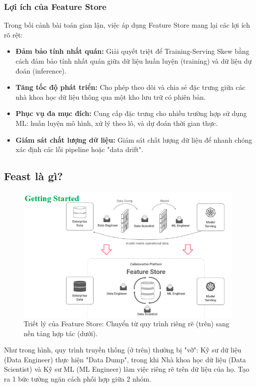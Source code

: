\documentclass[11pt]{article}
\begin{document}
\subsubsection{Lợi ích của Feature Store}
Trong bối cảnh bài toán gian lận, việc áp dụng Feature Store mang lại các lợi ích rõ rệt:
\begin{itemize}
    \item \textbf{Đảm bảo tính nhất quán:} Giải quyết triệt để Training-Serving Skew bằng cách đảm bảo tính nhất quán giữa dữ liệu huấn luyện (training) và dữ liệu dự đoán (inference).
    \item \textbf{Tăng tốc độ phát triển:} Cho phép theo dõi và chia sẻ đặc trưng giữa các nhà khoa học dữ liệu thông qua một kho lưu trữ có phiên bản.
    \item \textbf{Phục vụ đa mục đích:} Cung cấp đặc trưng cho nhiều trường hợp sử dụng ML: huấn luyện mô hình, xử lý theo lô, và dự đoán thời gian thực.
    \item \textbf{Giám sát chất lượng dữ liệu:} Giám sát chất lượng dữ liệu để nhanh chóng xác định các lỗi pipeline hoặc "data drift".
\end{itemize}

\subsection{Feast là gì?}

\begin{figure}[H]
    \centering
    \includegraphics[width=0.9\linewidth]{images/whyfeast.png}
    \caption{Triết lý của Feature Store: Chuyển từ quy trình riêng rẽ (trên) sang nền tảng hợp tác (dưới).}
\end{figure}

Như trong hình, quy trình truyền thống (ở trên) thường bị "vỡ": Kỹ sư dữ liệu (Data Engineer) thực hiện "Data Dump", trong khi Nhà khoa học dữ liệu (Data Scientist) và Kỹ sư ML (ML Engineer) làm việc riêng rẽ trên dữ liệu của họ. Tạo ra 1 bức tường ngăn cách phối hợp giữa 2 nhóm. \\
\end{document}
